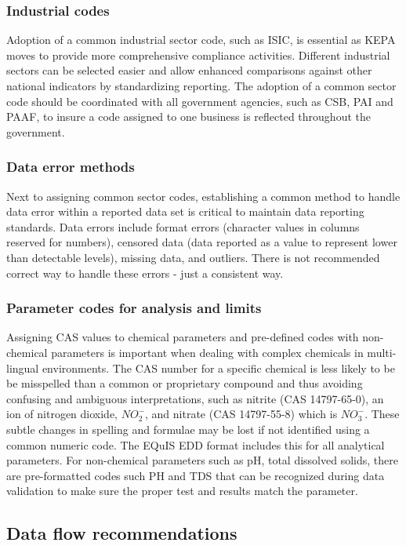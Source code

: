 \subsubsection{Industrial codes}
Adoption of a common industrial sector code, such as ISIC, is essential as KEPA moves to provide more comprehensive  compliance activities. Different industrial sectors can be selected easier and allow enhanced comparisons against other national indicators by standardizing reporting. The adoption of a common sector code should be coordinated with all government agencies, such as CSB, PAI and PAAF, to insure a code assigned to one business is reflected throughout the government.

\subsubsection{Data error methods}
Next to assigning common sector codes, establishing a common method to handle data error within a reported data set is critical to maintain data reporting standards. Data errors include format errors (character values in columns reserved for numbers), censored data (data reported as a value to represent lower than detectable levels), missing data, and outliers. There is not recommended correct way to handle these errors - just a consistent way.

\subsubsection{Parameter codes for analysis and limits}
Assigning CAS values to chemical parameters and pre-defined codes with non-chemical parameters is important when dealing with complex chemicals in multi-lingual environments. The CAS number for a specific chemical is less likely to be be misspelled than a common or proprietary compound and thus avoiding confusing and ambiguous interpretations, such as nitrite (CAS 14797-65-0), an ion of nitrogen dioxide, $NO^{-}_{2}$, and nitrate (CAS 14797-55-8) which is $NO^{-}_{3}$. These subtle changes in spelling and formulae may be lost if not identified using a common numeric code. The EQuIS EDD format includes this for all analytical parameters. For non-chemical parameters such as pH, total dissolved solids, there are pre-formatted codes such PH and TDS that can be recognized during data validation to make sure the proper test and results match the parameter.

\subsection{Data flow recommendations}

